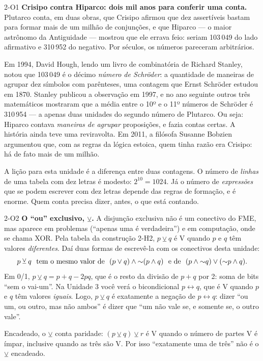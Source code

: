 \begin{obs}{2-O1}
\textbf{Crisipo contra Hiparco: dois mil anos para conferir uma conta.} Plutarco conta, em duas obras, que Crisipo afirmou que dez assertíveis bastam para formar mais de um milhão de conjunções, e que Hiparco — o maior astrônomo da Antiguidade — mostrou que ele errava feio: seriam 103\,049 do lado afirmativo e 310\,952 do negativo. Por séculos, os números pareceram arbitrários.

Em 1994, David Hough, lendo um livro de combinatória de Richard Stanley, notou que 103\,049 é o décimo \emph{número de Schröder}: a quantidade de maneiras de agrupar dez símbolos com parênteses, uma contagem que Ernst Schröder estudou em 1870. Stanley publicou a observação em 1997, e no ano seguinte outros três matemáticos mostraram que a média entre o 10º e o 11º números de Schröder é 310\,954 — a apenas duas unidades do segundo número de Plutarco. Ou seja: Hiparco contava \emph{maneiras de agrupar} proposições, e fazia contas certas. A história ainda teve uma reviravolta. Em 2011, a filósofa Susanne Bobzien argumentou que, com as regras da lógica estoica, quem tinha razão era Crisipo: há de fato mais de um milhão.

A lição para esta unidade é a diferença entre duas contagens. O número de \emph{linhas} de uma tabela com dez letras é modesto: $2^{10}=1024$. Já o número de \emph{expressões} que se podem escrever com dez letras depende das regras de formação, e é enorme. Quem conta precisa dizer, antes, o que está contando.
\end{obs}

\begin{obs}{2-O2}
\textbf{O \enquote{ou} exclusivo, $\veebar$.} A disjunção exclusiva não é um conectivo do FME, mas aparece em problemas (\enquote{apenas uma é verdadeira}) e em computação, onde se chama XOR. Pela tabela da construção 2-H2, $p\veebar q$ é V quando $p$ e $q$ têm valores \emph{diferentes}. Daí duas formas de escrevê-la com os conectivos desta unidade:
\[p\veebar q\ \text{ tem o mesmo valor de }\ (p\vee q)\wedge{\nao}(p\wedge q)\ \text{ e de }\ (p\wedge{\nao}q)\vee({\nao}p\wedge q).\]
Em 0/1, $p\veebar q=p+q-2pq$, que é o resto da divisão de $p+q$ por 2: soma de bits \enquote{sem o vai-um}. Na Unidade 3 você verá o bicondicional $p\leftrightarrow q$, que é V quando $p$ e $q$ têm valores \emph{iguais}. Logo, $p\veebar q$ é exatamente a negação de $p\leftrightarrow q$: dizer \enquote{ou um, ou outro, mas não ambos} é dizer que \enquote{um não vale se, e somente se, o outro vale}.

Encadeado, o $\veebar$ conta paridade: $(p\veebar q)\veebar r$ é V quando o número de partes V é ímpar, inclusive quando as três são V. Por isso \enquote{exatamente uma de três} não é o $\veebar$ encadeado.
\end{obs}

